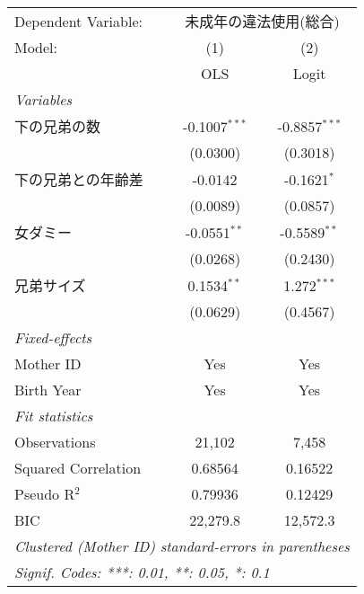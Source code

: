 \documentclass{article}
\begin{document}
\begingroup
\centering
\begin{tabular}{lcc}
   \tabularnewline \midrule \midrule
   Dependent Variable: & \multicolumn{2}{c}{未成年の違法使用(総合)}\\
   Model:              & (1)             & (2)\\  
                       &  OLS            & Logit\\  
   \midrule
   \emph{Variables}\\
   下の兄弟の数        & -0.1007$^{***}$ & -0.8857$^{***}$\\   
                       & (0.0300)        & (0.3018)\\   
   下の兄弟との年齢差  & -0.0142         & -0.1621$^{*}$\\   
                       & (0.0089)        & (0.0857)\\   
   女ダミー            & -0.0551$^{**}$  & -0.5589$^{**}$\\   
                       & (0.0268)        & (0.2430)\\   
   兄弟サイズ          & 0.1534$^{**}$   & 1.272$^{***}$\\   
                       & (0.0629)        & (0.4567)\\   
   \midrule
   \emph{Fixed-effects}\\
   Mother ID           & Yes             & Yes\\  
   Birth Year          & Yes             & Yes\\  
   \midrule
   \emph{Fit statistics}\\
   Observations        & 21,102          & 7,458\\  
   Squared Correlation & 0.68564         & 0.16522\\  
   Pseudo R$^2$        & 0.79936         & 0.12429\\  
   BIC                 & 22,279.8        & 12,572.3\\  
   \midrule \midrule
   \multicolumn{3}{l}{\emph{Clustered (Mother ID) standard-errors in parentheses}}\\
   \multicolumn{3}{l}{\emph{Signif. Codes: ***: 0.01, **: 0.05, *: 0.1}}\\
\end{tabular}
\par\endgroup
\end{document}
